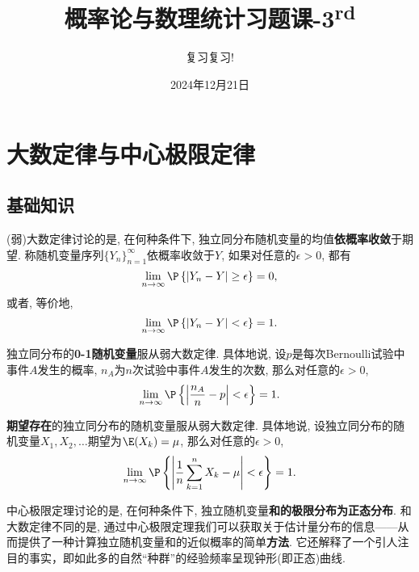 \documentclass[11pt]{ctexart}
\title{概率论与数理统计习题课-3\textsuperscript{rd}}
\author{复习复习!}
\date{2024年12月21日}
\begin{document}
\maketitle
{ 	
	\footnotesize
	\keben
	\tableofcontents
}


\section{大数定律与中心极限定律}

\subsection{基础知识}

{\keben (弱)大数定律}讨论的是, 在何种条件下, 独立同分布随机变量的均值\textbf{依概率收敛}于期望.
称随机变量序列$\{Y_n\}_{n=1}^{\infty}$依概率收敛于$Y$, 如果对任意的$\epsilon > 0$, 都有
\begin{equation*}
	\lim_{n \to \infty} \P \left\{ |Y_n - Y| \geq \epsilon \right\} = 0, 
\end{equation*}
或者, 等价地, 
\begin{equation*}
	\lim_{n \to \infty} \P \left\{ |Y_n - Y| < \epsilon \right\} = 1.  
\end{equation*}

\begin{theorem}[伯努利大数定律]
	独立同分布的\textbf{0-1随机变量}服从弱大数定律. 
	具体地说, 设$p$是每次Bernoulli试验中事件$A$发生的概率, $n_A$为$n$次试验中事件$A$发生的次数, 那么对任意的$\epsilon > 0$, 
	\begin{equation*}
		\lim_{n \to \infty} \P \left\{ \left|\frac{n_A}{n} - p \right| < \epsilon \right\} = 1.
	\end{equation*}
\end{theorem}

\begin{theorem}[辛钦大数定律]
	\textbf{期望存在}的独立同分布的随机变量服从弱大数定律.
	具体地说, 设独立同分布的随机变量$X_1, X_2, \dots$期望为$\E(X_k) = \mu$, 那么对任意的$\epsilon > 0$, 
	\begin{equation*}
		\lim_{n \to \infty} \P \left\{ \left|\frac{1}{n} \sum_{k=1}^n X_k - \mu \right| < \epsilon \right\} = 1.
	\end{equation*}
\end{theorem}


{\keben 中心极限定理}讨论的是, 在何种条件下, 独立随机变量\textbf{和的极限分布为正态分布}. 
和大数定律不同的是, 通过中心极限定理我们可以获取关于估计量分布的信息——从而提供了一种计算独立随机变量和的近似概率的简单\textbf{方法}. 
它还解释了一个引人注目的事实，即如此多的自然“种群”的经验频率呈现钟形(即正态)曲线. 
\end{document}
